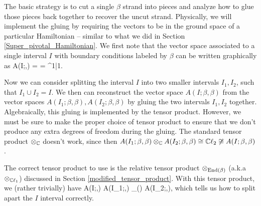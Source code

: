 The basic strategy is to cut a single $\beta$ strand into pieces and analyze how to glue those pieces back together to recover the uncut strand.
Physically, we will implement the gluing by requiring the vectors to be in the ground space of a particular Hamiltonian -- similar to what we did in Section \ref{Super_pivotal_Hamiltonian}. 
We first note that the vector space associated to a single interval $I$ with boundary conditions labeled by $\beta$ can be written graphically as 
\be\label{VIbetabeta}
 A(I;\beta,\beta) = \cc \left[ \halfchain\;, \; \halfchaindot \right] = \cc^{1|1}.\ee
 
 Now we can consider splitting the interval $I$ into two smaller intervals $I_1,I_2$, such that $I_1\cup I_2 = I$.
 We then can reconstruct the vector space $A(I;\beta,\beta)$ from the vector 
 spaces $A(I_1;\beta,\beta),A(I_2;\beta,\beta)$ by gluing the two intervals $I_1,I_2$ together. 
Algebraically, this gluing is implemented by the tensor product. However, 
we must be sure to make the proper choice 
of tensor product to ensure that we don't produce any extra degrees of freedom during the gluing. 
The standard tensor product $\otimes_{\mathbb{C}}$ doesn't work, since then $A(I_1;\beta,\beta) \otimes_{\mathbb{C}} A(I_2;\beta,\beta) \cong \mathbb{C}\ell_2 \not\cong A(I;\beta,\beta)$. 

The correct tensor product to use is the relative tensor product $\otimes_{\text{End}(\beta)}$ (a.k.a $\otimes_{\mathbb{C}\ell_1}$) discussed in Section \ref{modified_tensor_product}. 
With this tensor product, we (rather trivially) have 
\be A(I;\beta,\beta) \cong A(I_1;\beta,\beta) \tp_{\End(\beta)} A(I_2;\beta,\beta),\ee
which tells us how to split apart the $I$ interval correctly. 

